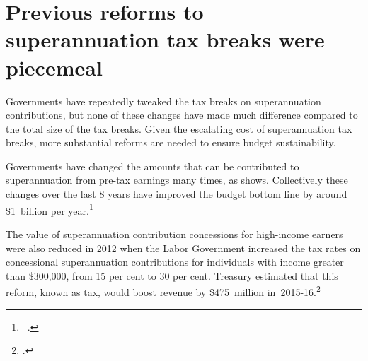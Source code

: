\section{Previous reforms to superannuation tax breaks were piecemeal}\label{sec:SUPER-3-8}
Governments have repeatedly tweaked the tax breaks on superannuation contributions, but none of these changes have made much difference compared to the total size of the tax breaks. Given the escalating cost of superannuation tax breaks, more substantial reforms are needed to ensure budget sustainability. 


Governments have changed the amounts that can be contributed to superannuation from pre-tax earnings many times, as \DEVIATION{} shows. Collectively these changes over the last 8 years have improved the budget bottom line by around \$1~billion per year.\footnote{\gao\ \textcite{TreasurymultipleyearsBudgetPapers200809to201516}.}  


The value of superannuation contribution concessions for high-income earners were also reduced in 2012 when the Labor Government increased the tax rates on concessional superannuation contributions for individuals with income greater than \$300,000, from 15 per cent to 30 per cent. Treasury estimated that this reform, known as  tax, would boost revenue by \$475~million in~2015-16.\footcite[][41]{Treasury2012} 

